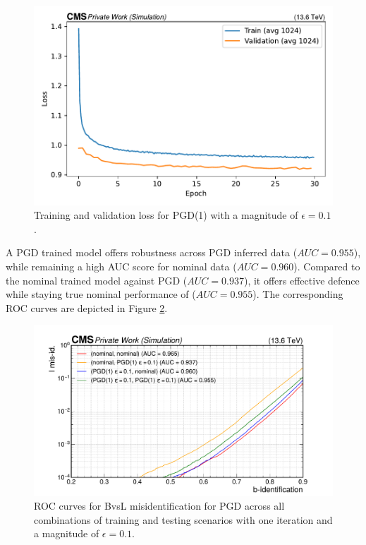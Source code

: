\begin{figure}[h]
\centering
    
    \includegraphics[width=12cm]{media/output/pgd eps=0.1, it=1, individual_loss_validation.pdf}
    \caption{Training and validation loss for PGD(1) with a magnitude of $\epsilon=0.1$.}
    \label{fig:pgd_loss_curve}
\end{figure}

A PGD trained model offers robustness across PGD inferred data ($AUC=0.955$), while remaining a high AUC score for nominal data ($AUC=0.960$). Compared to the nominal trained model against PGD ($AUC=0.937$), it offers effective defence while staying true nominal performance of ($AUC=0.955$). The corresponding ROC curves are depicted in Figure \ref{fig:pgd_trained}. 

\begin{figure}[h]
\centering
    \includegraphics[width=12cm]{media/output/roc_bvsl_pgd_perms.pdf}
    \caption{ROC curves for BvsL misidentification for PGD across all combinations of training and testing scenarios with one iteration and a magnitude of $\epsilon=0.1$.}
    \label{fig:pgd_trained}
\end{figure}


